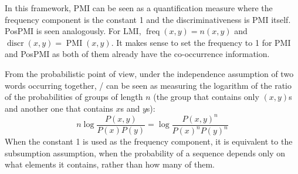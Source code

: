 In this framework, PMI can be seen as a quantification measure where the frequency component is the constant 1 and the discriminativeness is PMI itself. PosPMI is seen analogously. For LMI, $\operatorname{freq}(x, y) = n(x, y)$ and $\operatorname{discr}(x, y) = \operatorname{PMI}(x, y)$. It makes sense to set the frequency to 1 for PMI and PosPMI as both of them already have the co-occurrence information.




From the probabilistic point of view, under the independence assumption of two words occurring together, \NPMI/ can be seen as measuring the logarithm of the ratio of the probabilities of groups of length $n$ (the group that contains only $(x,y)$s and another one that contains $x$s and $y$s):
%
\begin{equation*}
  n\log\frac{P(x, y)}{P(x)P(y)} = \log\frac{P(x, y)^{n}}{P(x)^{n}P(y)^{n}}
\end{equation*}
%
When the constant 1 is used as the frequency component, it is equivalent to the subsumption assumption, when the probability of a sequence depends only on what elements it contains, rather than how many of them.

